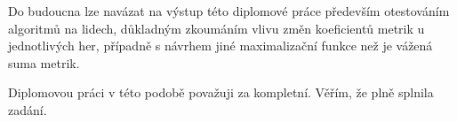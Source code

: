 Do budoucna lze navázat na výstup této diplomové práce především otestováním algoritmů na lidech, důkladným zkoumáním vlivu změn koeficientů metrik u jednotlivých her, případně s návrhem jiné maximalizační funkce než je vážená suma metrik.

Diplomovou práci v této podobě považuji za kompletní. Věřím, že plně splnila zadání.

\endinput
